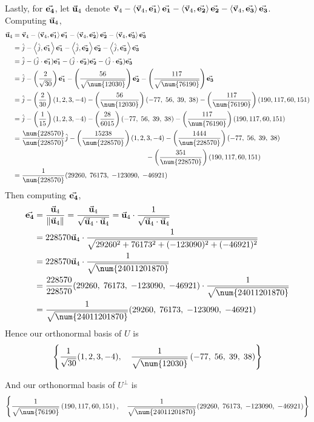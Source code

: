     \newpage \noindent Lastly, for $\vec{\mathbf{e_{4}}}$, let $\vec{\mathbf{u}}_4$ denote $\vec{\mathbf{v}}_4 - \left\langle{\vec{\mathbf{v}}_4, \vec{\mathbf{e_{1}}}}\right\rangle\vec{\mathbf{e_{1}}}  - \left\langle{\vec{\mathbf{v}}_4, \vec{\mathbf{e_{2}}}}\right\rangle\vec{\mathbf{e_{2}}}  - \left\langle{\vec{\mathbf{v}}_4, \vec{\mathbf{e_{3}}}}\right\rangle\vec{\mathbf{e_{3}}}$. Computing $\vec{\mathbf{u}}_4$,
    \begin{align*}
        \bu_4 &= \bv_4 - \inner{\bv_4, \ev1}\ev1  - \inner{\bv_4, \ev2}\ev2  - \inner{\bv_4, \ev3}\ev3\\
        &= \hat{j} - \inner{\hat{j}, \ev1}\ev1  - \inner{\hat{j}, \ev2}\ev2  - \inner{\hat{j}, \ev3}\ev3\\
        &= \hat{j} - (\hat{j} \cdot \ev1)\ev1 - (\hat{j} \cdot \ev2)\ev2 - (\hat{j}\cdot \ev3)\ev3\\
        &= \hat{j} - \pfrac{2}{\sqrt{30}}\ev1 - \pfrac{56}{\sqrt{\num{12030}}}\ev2 - \pfrac{117}{\sqrt{\num{76190}}}\ev3\\
        &= \hat{j} - \pfrac{2}{30} (1,2,3,-4)
        - \pfrac{56}{\num{12030}} \pars{-77,\; 56,\; 39,\; 38}
        - \pfrac{117}{\num{76190}}\pars{190, 117, 60, 151}
        \\
        &= \hat{j} - \pfrac{1}{15} (1,2,3,-4)
        - \pfrac{28}{6015} \pars{-77,\; 56,\; 39,\; 38}
        - \pfrac{117}{\num{76190}}\pars{190, 117, 60, 151} \\
        &= \frac{\num{228570}}{\num{228570}}\hat{j} - \pfrac{15238}{\num{228570}}(1,2,3,-4) - \pfrac{1444}{\num{228570}}\pars{-77,\; 56,\; 39,\; 38} \\ & \hspace{2.7in} - \pfrac{351}{\num{228570}}\pars{190, 117, 60, 151} \\
        &= \over{\num{228570}} (29260,\; 76173,\; -123090, \;-46921)
    \end{align*}
    Then computing $\vec{\mathbf{e_{4}}}$,
    \begin{align*}
        \ev4 &= \frac{\bu_4}{\norm{\bu_4}} = \frac{\bu_4}{\sqrt{\bu_4 \cdot \bu_4}} = \bu_4 \cdot \frac{1}{\sqrt{\bu_4 \cdot \bu_4}}\\
        &= 228570\bu_4 \cdot \over{\sqrt{29260^2 + 76173^2 + (-123090)^2+(-46921)^2}}\\
        &= 228570\bu_4 \cdot \over{\sqrt{\num{24011201870}}}\\
        &= \frac{228570}{228570} (29260,\; 76173,\; -123090, \;-46921) \cdot \over{\sqrt{\num{24011201870}}}\\
        &=  \over{\sqrt{\num{24011201870}}} (29260,\; 76173,\; -123090, \;-46921)
    \end{align*}
    Hence our orthonormal basis of $U$ is 
    $$\set{ \over{\sqrt{30}}(1,2,3,-4), \quad  \over{\sqrt{\num{12030}}}\pars{-77,\; 56,\; 39,\; 38} }$$
    
    \nnl And our orthonormal basis of $U^{\perp}$ is
    $$\set{\over{\sqrt{\num{76190}}}\pars{190, 117, 60, 151}, \quad \over{\sqrt{\num{24011201870}}} (29260,\; 76173,\; -123090, \;-46921) }$$